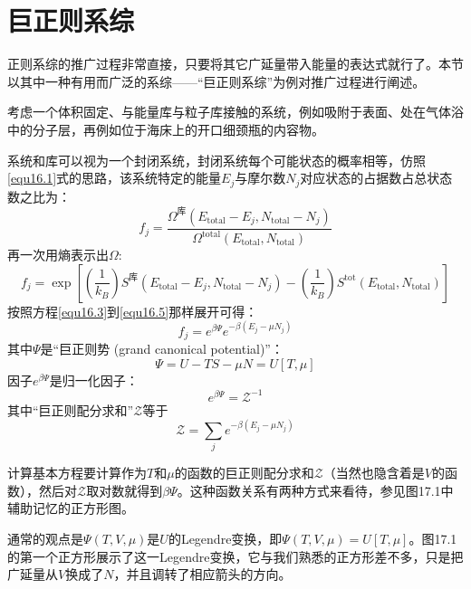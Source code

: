 \section{巨正则系综}
\label{sec17.3}
正则系综的推广过程非常直接，只要将其它广延量带入能量的表达式就行了。本节以其中一种有用而广泛的系综——“巨正则系综”为例对推广过程进行阐述。

考虑一个体积固定、与能量库与粒子库接触的系统，例如吸附于表面、处在气体浴中的分子层，再例如位于海床上的开口细颈瓶的内容物。

系统和库可以视为一个封闭系统，封闭系统每个可能状态的概率相等，仿照\eqref{equ16.1}式的思路，该系统特定的能量$E_j$与摩尔数$N_j$对应状态的占据数占总状态数之比为：
\begin{equation}
	f_j = \frac{\Omega^{\text{库}} (E_{\text{total}} - E_j, N_{\text{total}} - N_j)}{\Omega^{\text{total}} (E_{\text{total}}, N_{\text{total}})}
\label{equ17.21}
\end{equation}
再一次用熵表示出$\Omega$:
\begin{equation}
	f_j = \exp \left[ \left( \frac{1}{k_B} \right) S^{\text{库}} (E_{\text{total}} - E_j, N_{\text{total}} - N_j) - \left( \frac{1}{k_B} \right) S^{\text{tot}} (E_{\text{total}}, N_{\text{total}}) \right]
\label{equ17.22}
\end{equation}
按照方程\eqref{equ16.3}到\eqref{equ16.5}那样展开可得：
\begin{equation}
	f_j = e^{\beta \Psi} e^{-\beta (E_j - \mu N_j)}
\label{equ17.23}
\end{equation}
其中$\Psi$是“巨正则势 (grand canonical potential)”：
\begin{equation}
	\Psi = U - TS - \mu N = U[T, \mu]
\label{equ17.24}
\end{equation}
因子$e^{\beta \Psi}$是归一化因子：
\begin{equation}
	e^{\beta \Psi} = \mathcal{Z}^{-1}
\label{equ17.25}
\end{equation}
其中“巨正则配分求和”$\mathcal{Z}$等于
\begin{equation}
	\mathcal{Z} = \sum_j e^{-\beta (E_j - \mu N_j)}
\label{equ17.26}
\end{equation}

计算基本方程要计算作为$T$和$\mu$的函数的巨正则配分求和$\mathcal{Z}$（当然也隐含着是$V$的函数），然后对$\mathcal{Z}$取对数就得到$\beta \Psi$。这种函数关系有两种方式来看待，参见图17.1中辅助记忆的正方形图。

通常的观点是$\Psi (T, V, \mu)$是$U$的Legendre变换，即$\Psi (T, V, \mu) = U[T, \mu]$。图17.1的第一个正方形展示了这一Legendre变换，它与我们熟悉的正方形差不多，只是把广延量从$V$换成了$N$，并且调转了相应箭头的方向。

